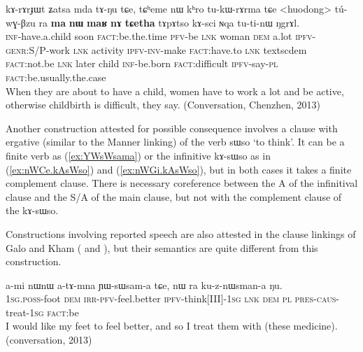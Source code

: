 \documentclass[oldfontcommands,oneside,a4paper,11pt]{article}
\newcommand{\ipa}[1]{{\phon \mbox{#1}}} %
\newcommand{\refb}[1]{(\ref{#1})}
\begin{document}
  \begin{exe}
\ex \label{ex:Zatsa.mda}
\gll 
 \ipa{kɤ-rɤrɟɯt}  	\ipa{ʑatsa}  	\ipa{mda}  	\ipa{tɤ-ŋu}  	\ipa{tɕe,}  	\ipa{tɕʰeme}  	\ipa{nɯ}  	\ipa{kʰro}  	\ipa{tu-kɯ-rɤrma}  	\ipa{tɕe}  	<huodong>  	\ipa{tú-wɣ-βzu}  	\ipa{ra}  	\ipa{\textbf{ma}}  	\ipa{\textbf{nɯ}}  	\ipa{\textbf{maʁ}}  	\ipa{\textbf{nɤ}}  	\ipa{\textbf{tɕetha}}  	\ipa{tɤpɤtso}  	\ipa{kɤ-sci}  	\ipa{ɴqa}  	\ipa{tu-ti-nɯ}  	\ipa{ŋgrɤl.} \\
 \textsc{inf}-have.a.child soon \textsc{fact}:be.the.time  \textsc{pfv}-be \textsc{lnk} woman \textsc{dem} a.lot \textsc{ipfv-genr}:S/P-work \textsc{lnk} activity \textsc{ipfv-inv}-make \textsc{fact:}have.to \textsc{lnk} textsc{dem} \textsc{fact}:not.be \textsc{lnk}  later
 child \textsc{inf}-be.born  \textsc{fact}:difficult \textsc{ipfv}-say-\textsc{pl} \textsc{fact}:be.usually.the.case  \\
 \glt When they are about to have a child, women have to work a lot and be active, otherwise   childbirth is difficult, they say. (Conversation, Chenzhen, 2013)
 \end{exe}
 
 Another construction attested for possible consequence involves a clause with ergative (similar to the Manner linking) of the verb \ipa{sɯso} `to think'. It can be a finite verb as \refb{ex:YWsWsama} or the infinitive \ipa{kɤ-sɯso} as in \refb{ex:nWCe.kAsWso} and \refb{ex:nWGi.kAsWso}, but in both cases it  takes a finite complement clause.  There is necessary coreference between the A of the infinitival clause and the S/A of the main clause, but not with the complement clause of the  \ipa{kɤ-sɯso}. 
 
 Constructions involving reported speech are also attested in the clause linkings  of Galo and Kham  (\citealt[86, 88]{post09linking} and \citealt[110]{watters09kham}), but their semantics are quite different from this construction.
 
   \begin{exe}
\ex \label{ex:YWsWsama}
\gll 
\ipa{a-mi}  	\ipa{nɯnɯ}  	\ipa{a-tɤ-mna}  	\ipa{ɲɯ-sɯsam-a}  	\ipa{tɕe,}  	\ipa{nɯ} \ipa{ra}  	\ipa{ku-z-nɯsman-a}  	\ipa{ŋu.}   \\
\textsc{1sg.poss}-foot \textsc{dem} \textsc{irr-pfv}-feel.better  \textsc{ipfv}-think[III]-\textsc{1sg} \textsc{lnk} \textsc{dem} \textsc{pl} \textsc{pres-caus}-treat-\textsc{1sg}  \textsc{fact}:be \\
\glt I would like my feet to feel better, and so I treat them with (these medicine). (conversation, 2013)
  \end{exe}
 
\end{document}
